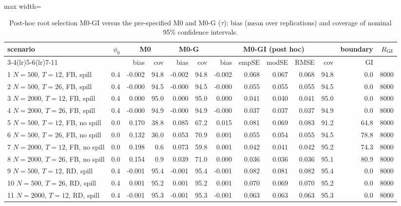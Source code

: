 \begin{table}[!t]
\centering
\caption{Post-hoc root selection M0-GI versus the pre-specified M0 and M0-G ($\tau$): bias (mean over replications) and coverage of nominal 95\% confidence intervals.}
\label{tab:sim-m0gi}
\footnotesize
\setlength{\tabcolsep}{3.5pt}
\begin{adjustbox}{max width=\linewidth}
\begin{tabular}{lrrrrrrrrrrrr}
\toprule
scenario & $\phi_0$ & \multicolumn{2}{c}{M0} & \multicolumn{2}{c}{M0-G} & \multicolumn{5}{c}{M0-GI (post hoc)} & boundary & $R_{\rm GI}$ \\
\cmidrule(lr){3-4}\cmidrule(lr){5-6}\cmidrule(lr){7-11}
 & & bias & cov & bias & cov & bias & empSE & modSE & RMSE & cov & GI & \\
\midrule
1 $N=500$, $T=12$, FB, spill & 0.4 & -0.002 & 94.8 & -0.002 & 94.8 & -0.002 & 0.068 & 0.067 & 0.068 & 94.8 & 0.0 & 8000 \\
2 $N=500$, $T=26$, FB, spill & 0.4 & -0.000 & 94.5 & -0.000 & 94.5 & -0.000 & 0.055 & 0.055 & 0.055 & 94.5 & 0.0 & 8000 \\
3 $N=2000$, $T=12$, FB, spill & 0.4 & 0.000 & 95.0 & 0.000 & 95.0 & 0.000 & 0.041 & 0.040 & 0.041 & 95.0 & 0.0 & 8000 \\
4 $N=2000$, $T=26$, FB, spill & 0.4 & -0.000 & 94.9 & -0.000 & 94.9 & -0.000 & 0.037 & 0.037 & 0.037 & 94.9 & 0.0 & 8000 \\
5 $N=500$, $T=12$, FB, no spill & 0.0 & 0.170 & 38.8 & 0.085 & 67.2 & 0.015 & 0.081 & 0.069 & 0.083 & 91.2 & 64.8 & 8000 \\
6 $N=500$, $T=26$, FB, no spill & 0.0 & 0.132 & 36.0 & 0.053 & 70.9 & 0.001 & 0.055 & 0.054 & 0.055 & 94.5 & 78.8 & 8000 \\
7 $N=2000$, $T=12$, FB, no spill & 0.0 & 0.198 & 0.6 & 0.073 & 59.8 & 0.001 & 0.042 & 0.041 & 0.042 & 95.2 & 74.3 & 8000 \\
8 $N=2000$, $T=26$, FB, no spill & 0.0 & 0.154 & 0.9 & 0.039 & 71.0 & 0.000 & 0.036 & 0.036 & 0.036 & 95.1 & 80.9 & 8000 \\
9 $N=500$, $T=12$, RD, spill & 0.4 & -0.001 & 95.4 & -0.001 & 95.4 & -0.001 & 0.082 & 0.081 & 0.082 & 95.4 & 0.0 & 8000 \\
10 $N=500$, $T=26$, RD, spill & 0.4 & 0.001 & 95.2 & 0.001 & 95.2 & 0.001 & 0.070 & 0.069 & 0.070 & 95.2 & 0.0 & 8000 \\
11 $N=2000$, $T=12$, RD, spill & 0.4 & -0.001 & 95.3 & -0.001 & 95.3 & -0.001 & 0.063 & 0.063 & 0.063 & 95.3 & 0.0 & 8000 \\

\end{tabular}
\end{adjustbox}
\end{table}
